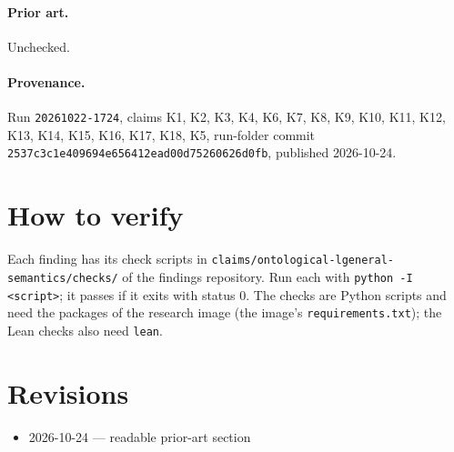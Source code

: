 \documentclass{article}
\begin{document}
\paragraph{Prior art.} Unchecked.

\paragraph{Provenance.}
Run \texttt{20261022-1724}, claims K1, K2, K3, K4, K6, K7, K8, K9, K10, K11, K12, K13, K14, K15, K16, K17, K18, K5, run-folder commit \texttt{2537c3c1e409694e656412ead00d75260626d0fb}, published 2026-10-24.

\section{How to verify}

Each finding has its check scripts in \texttt{claims/ontological-lgeneral-semantics/checks/} of the findings repository. Run each with \texttt{python -I <script>}; it passes if it exits with status 0. The checks are Python scripts and need the packages of the research image (the image's \texttt{requirements.txt}); the Lean checks also need \texttt{lean}.

\section{Revisions}

\begin{itemize}
\item 2026-10-24 --- readable prior-art section
\end{itemize}



\end{document}
